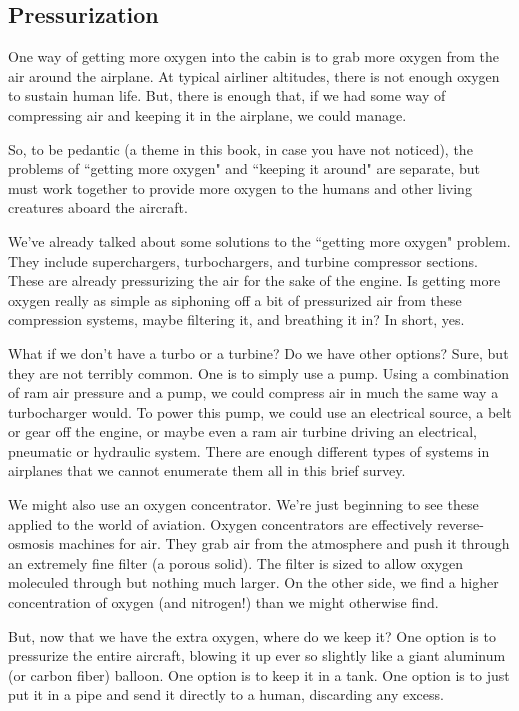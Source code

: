 \subsection{Pressurization}

One way of getting more oxygen into the cabin is to grab more oxygen from the air around the airplane. At typical airliner altitudes, there is not enough oxygen to sustain human life. But, there is enough that, if we had some way of compressing air and keeping it in the airplane, we could manage.

So, to be pedantic (a theme in this book, in case you have not noticed), the problems of ``getting more oxygen" and ``keeping it around" are separate, but must work together to provide more oxygen to the humans and other living creatures aboard the aircraft.

We've already talked about some solutions to the ``getting more oxygen" problem. They include superchargers, turbochargers, and turbine compressor sections. These are already pressurizing the air for the sake of the engine. Is getting more oxygen really as simple as siphoning off a bit of pressurized air from these compression systems, maybe filtering it, and breathing it in? In short, yes.

What if we don't have a turbo or a turbine? Do we have other options? Sure, but they are not terribly common. One is to simply use a pump. Using a combination of ram air pressure and a pump, we could compress air in much the same way a turbocharger would. To power this pump, we could use an electrical source, a belt or gear off the engine, or maybe even a ram air turbine driving an electrical, pneumatic or hydraulic system. There are enough different types of systems in airplanes that we cannot enumerate them all in this brief survey.

We might also use an oxygen concentrator. We're just beginning to see these applied to the world of aviation. Oxygen concentrators are effectively reverse-osmosis machines for air. They grab air from the atmosphere and push it through an extremely fine filter (a porous solid). The filter is sized to allow oxygen moleculed through but nothing much larger. On the other side, we find a higher concentration of oxygen (and nitrogen!) than we might otherwise find.

But, now that we have the extra oxygen, where do we keep it? One option is to pressurize the entire aircraft, blowing it up ever so slightly like a giant aluminum (or carbon fiber) balloon. One option is to keep it in a tank. One option is to just put it in a pipe and send it directly to a human, discarding any excess.


